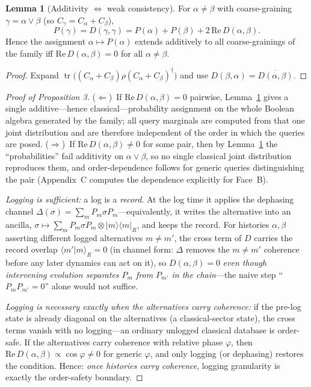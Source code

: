 \documentclass[11pt]{article}
\newcommand{\ket}[1]{\lvert #1 \rangle}
\newcommand{\bra}[1]{\langle #1 \rvert}
\newcommand{\tr}{\operatorname{tr}}
\theoremstyle{definition}
\newtheorem{qlem}{Lemma}
\begin{document}
\begin{qlem}[Additivity $\Leftrightarrow$ weak consistency]\label{lem:add}
For $\alpha\neq\beta$ with coarse-graining $\gamma=\alpha\vee\beta$ (so $C_\gamma=C_\alpha+C_\beta$),
\[
P(\gamma)=D(\gamma,\gamma)=P(\alpha)+P(\beta)+2\,\mathrm{Re}\,D(\alpha,\beta).
\]
Hence the assignment $\alpha\mapsto P(\alpha)$ extends additively to all coarse-grainings of the family iff $\mathrm{Re}\,D(\alpha,\beta)=0$ for all $\alpha\neq\beta$.
\end{qlem}
\begin{proof} Expand $\tr\big((C_\alpha+C_\beta)\rho(C_\alpha+C_\beta)^\dagger\big)$ and use $D(\beta,\alpha)=\overline{D(\alpha,\beta)}$. \end{proof}

\begin{proof}[Proof of Proposition 3]
($\Leftarrow$)~If $\mathrm{Re}\,D(\alpha,\beta)=0$ pairwise, Lemma~\ref{lem:add} gives a single additive---hence classical---probability assignment on the whole Boolean algebra generated by the family; all query marginals are computed from that one joint distribution and are therefore independent of the order in which the queries are posed.
($\Rightarrow$)~If $\mathrm{Re}\,D(\alpha,\beta)\neq0$ for some pair, then by Lemma~\ref{lem:add} the ``probabilities'' fail additivity on $\alpha\vee\beta$, so no single classical joint distribution reproduces them, and order-dependence follows for generic queries distinguishing the pair (Appendix~C computes the dependence explicitly for Face~B).

\emph{Logging is sufficient:} a log is a \emph{record}. At the log time it applies the dephasing channel $\Delta(\sigma)=\sum_m P_m\sigma P_m$---equivalently, it writes the alternative into an ancilla, $\sigma\mapsto\sum_m P_m\sigma P_m\otimes\ket m\bra m_R$, and keeps the record. For histories $\alpha,\beta$ asserting different logged alternatives $m\neq m'$, the cross term of $D$ carries the record overlap $\langle m'|m\rangle_R=0$ (in channel form: $\Delta$ removes the $m\neq m'$ coherence before any later dynamics can act on it), so $D(\alpha,\beta)=0$ \emph{even though intervening evolution separates $P_m$ from $P_{m'}$ in the chain}---the naive step ``$P_mP_{m'}=0$'' alone would not suffice.

\emph{Logging is necessary exactly when the alternatives carry coherence:} if the pre-log state is already diagonal on the alternatives (a classical-sector state), the cross terms vanish with no logging---an ordinary unlogged classical database is order-safe. If the alternatives carry coherence with relative phase $\varphi$, then $\mathrm{Re}\,D(\alpha,\beta)\propto\cos\varphi\neq0$ for generic $\varphi$, and only logging (or dephasing) restores the condition. Hence: \emph{once histories carry coherence}, logging granularity is exactly the order-safety boundary.
\end{proof}
\end{document}
